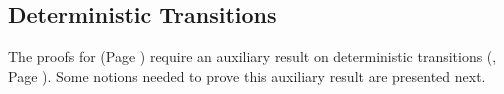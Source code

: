\begin{comment}
			\item	$\trec{t}{  \btbra{l_1: \vart{t}, l_2: \tinact}  }$
					\[
					\tree{
					}{
						\es; \es; t_1: \btout{\tinact} \tinact \cat t_2: \btout{\tinact} \tinact \cat
						s: \btbra{l_1: \tinact, l_2: \tinact} \proves
						\mapchar{\btbra{l_1: \tinact, l_2: \tinact}}{s} = \bbra{s}{l_1: \bout{t_1}{s} \inact, l_2: \bout{t_2}{s} \inact}
						\hastype \Proc
					}
					\]
					and
					\[
					\tree{
						\begin{array}{l}
			\es; \es; t_1: \btout{\trec{t}{  \btbra{l_1: \vart{t}, l_2: \tinact}}} \tinact
		\cat s: \trec{t}{  \btbra{l_1: \vart{t}, l_2: \tinact}} \proves
					\bout{t_1}{s} \inact \hastype \Proc
							\\
		\es; \es; t_2: \btout{\tinact} \tinact \cat \tinact \proves
				\bout{t_2}{s} \inact \hastype \Proc
						\end{array}
					}{
						\es; \es; t_1: \btout{\trec{t}{  \btbra{l_1: \vart{t}, l_2: \tinact}}} \tinact \cat t_2: \btout{\tinact} \tinact \cat
						s: \trec{t}{  \btbra{l_1: \vart{t}, l_2: \tinact}} \proves
						\mapchar{\trec{t}{\btbra{l_1: \vart{t}, l_2: \tinact}}}{s} = \bbra{s}{l_1: \bout{t_1}{s} \inact, l_2: \bout{t_2}{s} \inact}
						\hastype \Proc
					}
					\]
		\end{itemize}
	\end{example}
}
\end{comment}



\subsection{Deterministic Transitions}
\label{app:sub_tau_inert}


The proofs for 
 (Page \pageref{the:coincidence}) require an auxiliary result on 
deterministic transitions (, Page \pageref{lem:up_to_deterministic_transition}).
Some notions needed to prove this auxiliary result are presented next.

